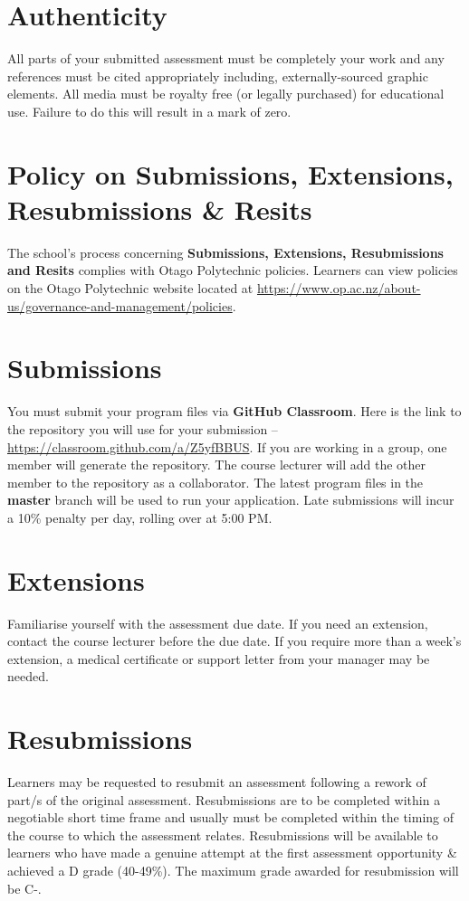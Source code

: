 \documentclass{article}
\begin{document}
\section*{Authenticity}
All parts of your submitted assessment must be completely your work and any references must be cited appropriately including, externally-sourced graphic elements. All media must be royalty free (or legally purchased) for educational use. Failure to do this will result in a mark of zero.

\section*{Policy on Submissions, Extensions, Resubmissions \& Resits}
The school's process concerning \textbf{Submissions, Extensions, Resubmissions and Resits} complies with Otago Polytechnic policies. Learners can view policies on the Otago Polytechnic website located at \href{https://www.op.ac.nz/about-us/governance-and-management/policies}{https://www.op.ac.nz/about-us/governance-and-management/policies}.

\section*{Submissions}
You must submit your program files via \textbf{GitHub Classroom}. Here is the link to the repository you will use for your submission – \href{https://classroom.github.com/a/Z5yfBBUS}{https://classroom.github.com/a/Z5yfBBUS}. If you are working in a group, one member will generate the repository. The course lecturer will add the other member to the repository as a collaborator. The latest program files in the \textbf{master} branch will be used to run your application. Late submissions will incur a 10\% penalty per day, rolling over at 5:00 PM.

\section*{Extensions}
Familiarise yourself with the assessment due date. If you need an extension, contact the course lecturer before the due date. If you require more than a week's extension, a medical certificate or support letter from your manager may be needed.

\section*{Resubmissions}
Learners may be requested to resubmit an assessment following a rework of part/s of the original assessment. Resubmissions are to be completed within a negotiable short time frame and usually must be completed within the timing of the course to which the assessment relates. Resubmissions will be available to learners who have made a genuine attempt at the first assessment opportunity \& achieved a D grade (40-49\%). The maximum grade awarded for resubmission will be C-.
\end{document}
